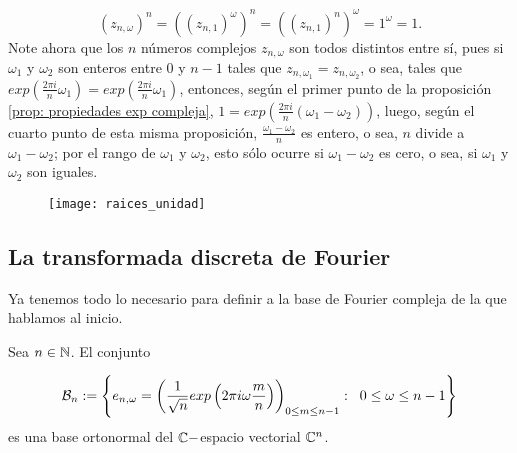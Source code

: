\[
(z_{n, \omega})^{n} = ((z_{n,1})^{\omega} )^{n} = 
((z_{n,1})^{n} )^{\omega} = 1^{\omega}=1. 
\]
Note ahora que los $n$ números complejos $z_{n, \omega}$ son todos 
distintos entre sí, pues si $\omega_{1}$ y $\omega_{2}$ son enteros
entre $0$ y $n-1$ tales que $z_{n, \omega_{1}} = z_{n, \omega_{2}}$,
o sea, tales que 
$exp \left( \frac{2 \pi i }{n} \omega_{1} \right) = 
exp \left( \frac{2 \pi i }{n} \omega_{1} \right)$, entonces, según el primer
punto de la proposición \ref{prop: propiedades exp compleja},
$1 = exp \left( \frac{2 \pi i }{n} (\omega_{1}-\omega_{2}) \right)$, luego, 
según el cuarto punto de esta misma proposición, $\frac{\omega_{1}-\omega_{2}}{n}$
es entero, o sea, $n$ divide a $\omega_{1}-\omega_{2}$; por el rango de 
$\omega_{1}$ y $\omega_{2}$, esto sólo ocurre si $\omega_{1}-\omega_{2}$ es
cero, o sea, si $\omega_{1}$ y $\omega_{2}$
son iguales.
\QEDB
\vspace{0.2cm}

\begin{figure}[H]
	\centering
	\texttt{[image: raices\_unidad]} 
\end{figure}	


\subsection{La transformada discreta de Fourier}

Ya tenemos todo lo necesario para definir a la base
de Fourier compleja de la que hablamos al inicio.


\begin{prop}
\label{prop: construccion Bn}
Sea $n \in \mathbb{N}$. El conjunto

\begin{equation}
\label{eq2: 8ab}
\mathcal{B}_{n} : = \left\{
e_{n,\omega} = \left(
\frac{1}{\sqrt{n}} exp \left(
2 \pi i \omega \frac{m}{n}
\right)
\right)_{0 \leq m \leq n-1}
: \hspace{0.2cm} 0 \leq \omega \leq n-1
 \right\}
\end{equation}
es una base ortonormal del $\mathbb{C}-$espacio
vectorial $\mathbb{C}^{n}$.
\end{prop}


